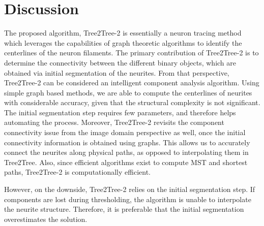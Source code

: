 \section{Discussion}
The proposed algorithm, Tree2Tree-2 is essentially a neuron tracing method which leverages the capabilities of graph theoretic algorithms to identify the centerlines of the neuron filaments. The primary contribution of Tree2Tree-2 is to determine the connectivity between the different binary objects, which are obtained via initial segmentation of the neurites. From that perspective, Tree2Tree-2 can be considered an intelligent component analysis algorithm. Using simple graph based methods, we are  able to compute the centerlines of neurites with considerable accuracy, given that the structural complexity is not significant. The initial segmentation step requires few parameters, and therefore helps automating the process. Moreover, Tree2Tree-2 revisits the component connectivity issue from the image domain perspective as well, once the initial connectivity information is obtained using graphs. This allows us to accurately connect the neurites along physical paths, as opposed to interpolating them in Tree2Tree. Also, since efficient algorithms exist to compute  MST and shortest paths, Tree2Tree-2 is computationally efficient.

However, on the downside, Tree2Tree-2 relies on the initial segmentation step. If components are lost during thresholding, the algorithm is unable to interpolate the neurite structure. Therefore, it is preferable that the initial segmentation overestimates the solution. 

